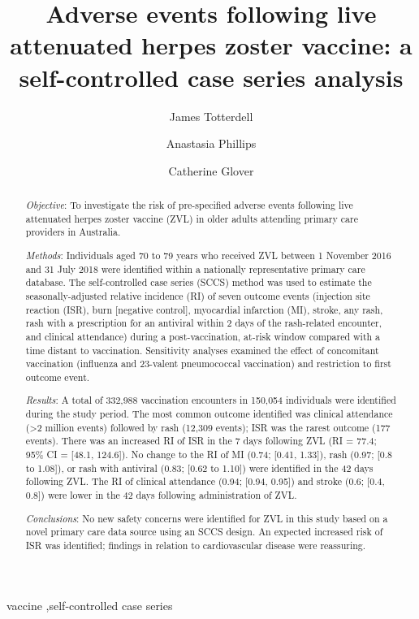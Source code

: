 \documentclass[review, endfloat]{elsarticle}
\title{Adverse events following live attenuated herpes zoster vaccine: a self-controlled case series analysis}
\author[1]{James Totterdell\corref{cor1}}
\author[2]{Anastasia Phillips}
\author[3]{Catherine Glover}
\begin{document}
\begin{frontmatter}

\begin{abstract}

\emph{Objective}: To investigate the risk of pre-specified adverse events following live attenuated herpes zoster vaccine (ZVL) in older adults attending primary care providers in Australia.

\emph{Methods}: Individuals aged 70 to 79 years who received ZVL between 1 November 2016 and 31 July 2018 were identified within a nationally representative primary care database. The self-controlled case series (SCCS) method was used to estimate the seasonally-adjusted relative incidence (RI) of seven outcome events (injection site reaction (ISR), burn [negative control], myocardial infarction (MI), stroke, any rash, rash with a prescription for an antiviral within 2 days of the rash-related encounter, and clinical attendance) during a post-vaccination, at-risk window compared with a time distant to vaccination. Sensitivity analyses examined the effect of concomitant vaccination (influenza and 23-valent pneumococcal vaccination) and restriction to first outcome event. 

\emph{Results}: A total of 332,988 vaccination encounters in 150,054 individuals were identified during the study period. The most common outcome identified was clinical attendance (\textgreater 2 million events) followed by rash (12,309 events); ISR was the rarest outcome (177 events). There was an increased RI of ISR in the 7 days following ZVL (RI = 77.4; 95\% CI = [48.1, 124.6]). No change to the RI of MI (0.74; [0.41, 1.33]), rash (0.97; [0.8 to 1.08]), or rash with antiviral (0.83; [0.62 to 1.10]) were identified in the 42 days following ZVL. The RI of clinical attendance (0.94; [0.94, 0.95]) and stroke (0.6; [0.4, 0.8]) were lower in the 42 days following administration of ZVL.

\emph{Conclusions}: No new safety concerns were identified for ZVL in this study based on a novel primary care data source using an SCCS design. An expected increased risk of ISR was identified; findings in relation to cardiovascular disease were reassuring.

\end{abstract}

\begin{keyword}
vaccine \sep self-controlled case series
\end{keyword}

\end{frontmatter}
\end{document}
